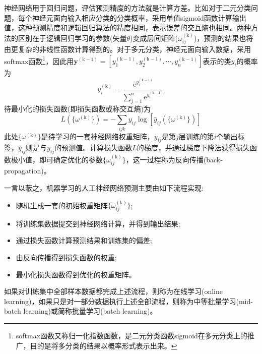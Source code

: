 \documentclass[10pt, oneside, a4paper]{article}      %
\begin{document}
神经网络用于回归问题，评估预测精度的方法就是计算方差。比如对于二元分类问题，每个神经元面向输入相应分类的分类概率，采用单值\textrm{sigmoid}函数计算输出值，这种预测精度和逻辑回归算法的精度相同，表示误差的交互熵也相同。两种方法的区别在于逻辑回归学习的参数(矢量$\theta$)变成层间矩阵($\omega_{ij}^{(\mathrm{k})}$)，预测的结果也将由更复杂的非线性函数计算得到的。对于多元分类，神经元面向输入数据，采用\textrm{softmax}函数\footnote{\textrm{softmax}函数又称归一化指数函数，是二元分类函数\textrm{sigmoid}在多元分类上的推广，目的是将多分类的结果以概率形式表示出来。}，因此用$\mathbf{y}^{(\mathrm{k}-1)}=[y_1^{(\mathrm{k}-1)},y_2^{(\mathrm{k}-1)},\cdots,y_n^{(\mathrm{k}-1)}]$表示的类$y_i$的概率为
\begin{displaymath}
	y_i^{(\mathrm{k})}=\dfrac{\mathrm{e}^{y_i^{(\mathrm{k}-1)}}}{\sum\limits_{j=1}^n\mathrm{e}^{y_i^{(\mathrm{k}-1)}}}
\end{displaymath}
待最小化的损失函数(即损失函数或称交互熵)为
\begin{displaymath}
	L(\{\omega^{(\mathrm{k})}\})=-\sum_{ijk}y_{ij}\log[\hat{y}_{ij}(\{\omega^{(\mathrm{k})}\})]
\end{displaymath}
此处$\{\omega^{(\mathrm{k})}\}$是待学习的一套神经网络权重矩阵，$y_{ij}$是第$j$层训练的第$i$个输出标签，$\hat{y}_{ij}$则是与$y_{ij}$的预测值。计算损失函数$L$的梯度，并通过梯度下降法获得损失函数极小值，即可确定优化的参数$\{\omega_{ij}^{(\mathrm{k})}\}$，这一过程称为反向传播\textrm{(back-propagation)}。

一言以蔽之，机器学习的人工神经网络预测主要由如下流程实现:
\begin{itemize}
	\item 随机生成一套的初始权重矩阵$\{\omega_{ij}^{(\mathrm{k})}\}$;
	\item 将训练集数据提交到神经网络计算，并得到输出结果;
	\item 通过损失函数计算预测结果和训练集的偏差;
	\item 由反向传播得到损失函数的权重;
	\item 最小化损失函数得到优化的权重矩阵。
\end{itemize}
如果对训练集中全部样本数据都完成上述流程，则称为在线学习\textrm{(online learning)}，如果只是对一部分数据执行上述全部流程，则称为中等批量学习\textrm{(mid-batch learning)}或简称批量学习\textrm{(batch learning)}。
\end{document}

